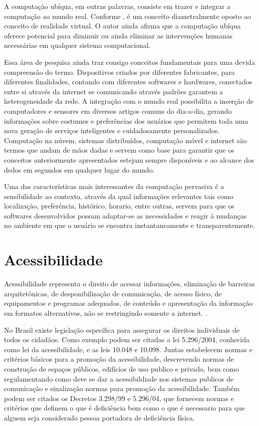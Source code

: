 \documentclass[english,brazilian]{UNISINOSmonografia}
\begin{document}
A computação ubíqua, em outras palavras, consiste em trazer e integrar a computação ao mundo real. Conforme , é um conceito diametralmente oposto ao conceito de realidade virtual. O autor ainda afirma que a computação ubíqua oferece potencial para diminuir ou ainda eliminar as intervenções humanas necessárias em qualquer sistema computacional.

Essa área de pesquisa ainda traz consigo conceitos fundamentais para uma devida compreensão do termo. Dispositivos criados por diferentes fabricantes, para diferentes finalidades, contando com diferentes softwares e hardwares, conectados entre si através da internet se comunicando através padrões garantem a heterogeneidade da rede. A integração com o mundo real possibilita a inserção de computadores e sensores em diversos artigos comuns do dia-a-dia, gerando informações sobre costumes e preferências dos usuários que permitem toda uma nova geração de serviços inteligentes e cuidadosamente personalizados. Computação na núvem, sistemas distribuídos, computação móvel e internet são termos que andam de mãos dadas e servem como base para garantir que os conceitos anteriormente apresentados estejam sempre disponíveis e ao alcance dos dedos em segundos em qualquer lugar do mundo.

Uma das características mais interessantes da computação pervasiva é a sensibilidade ao contexto, através da qual informações relevantes tais como localização, preferência, histórico, horario, entre outras, servem para que os softwares desenvolvidos possam adaptar-se as necessidades e reagir à mudanças no ambiente em que o usuário se encontra instantaneamente e transparentemente.

	\section{Acessibilidade}
Acessibilidade representa o direito de acessar informações, eliminação de barreiras arquitetônicas, de desponibilização de comunicação, de acesso físico, de equipamentos e programas adequados, de conteúdo e apresentação da informação em formatos alternativos, não se restringindo somente a internet. \cite{AcessibilidadeBrasil}.

No Brasil existe legislação específica para assegurar os direitos individuais de todos os cidadãos. Como exemplo podem ser citadas a lei 5.296/2004, conhecida como lei da acessibilidade, e as leis 10.048 e 10.098. Juntas estabelecem normas e critérios básicos para a promoção da acessibilidade, descrevendo normas de construção de espaços públicos, edifícios de uso publico e privado, bem como regulamentando como deve se dar a acessibildiade nos sistemas publicos de comunicação e sinalização normas para promoção da acessibilidade. Também podem ser citados os Decretos 3.298/99 e 5.296/04, que fornecem normas e critérios que definem o que é deficiência bem como o que é necessario para que alguem seja considerado pessoa portadora de deficiência física.
\end{document}
